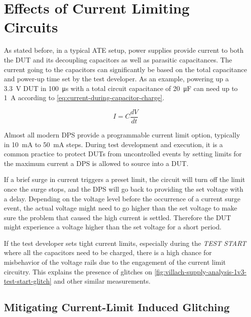 
\section{Effects of Current Limiting Circuits}
\label{sec:current-limiting-effects}

As stated before, in a typical \ac{ATE} setup, power supplies provide current to
both the DUT and its decoupling capacitors as well as parasitic capacitances.
The current going to the capacitors can significantly be based on the total
capacitance and power-up time set by the test developer.
As an example, powering up a \SI{3.3}{\volt} \ac{DUT} in \SI{100}{\micro\second}
with a total circuit capacitance of \SI{20}{\micro\farad} can need up to
\SI{1}{\ampere} according to \autoref{eq:current-during-capacitor-charge}.

\begin{equation}
    \label{eq:current-during-capacitor-charge}
    I = C \frac{dV}{dt}
\end{equation}

Almost all modern \ac{DPS} provide a programmable current limit option,
typically in \SI{10}{\milli\ampere} to \SI{50}{\milli\ampere} steps.
During test development and execution, it is a common practice to protect
\acp{DUT} from uncontrolled events by setting limits for the maximum current
a \ac{DPS} is allowed to source into a \ac{DUT}.

If a brief surge in current triggers a preset limit, the circuit will turn off
the limit once the surge stops, and the DPS will go back to providing the set
voltage with a delay.
Depending on the voltage level before the occurrence of a current surge event,
the actual voltage might need to go higher than the set voltage to make sure the
problem that caused the high current is settled.
Therefore the DUT might experience a voltage higher than the set
voltage for a short period.

If the test developer sets tight current limits, especially during the
\emph{TEST START} where all the capacitors need to be charged, there is a high
chance for misbehavior of the voltage rails due to the engagement of the current
limit circuitry.
This explains the presence of glitches
on \autoref{fig:villach-supply-analysis-1v3-test-start-glitch} and other
similar measurements.

\subsection{Mitigating Current-Limit Induced Glitching}
\label{subsec:current-limiting-effects}

